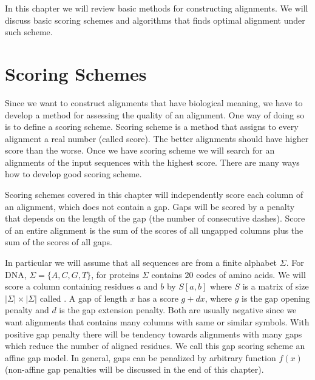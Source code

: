 In this chapter we will review basic methods for constructing alignments. We will
discuss basic scoring schemes and algorithms that finds optimal alignment under
such scheme.


\section{Scoring Schemes}

Since we want to construct alignments that have biological meaning, we have to
develop a method for assessing the quality of an alignment. One way of doing so
is to define a scoring scheme. Scoring scheme is a method that assigns to every
alignment a real number (called score). The better alignments should have higher
score than the worse. Once we have scoring scheme we will search for an
alignments of the input sequences with the highest score.  There are many ways
how to develop good scoring scheme. 


Scoring schemes covered in this chapter will independently score each column of
an alignment, which does not contain a gap. Gaps will be scored by a penalty
that depends on the length of the gap (the number of consecutive dashes). Score
of an entire alignment is the sum of the scores of all ungapped columns plus the
sum of the scores of all gaps.

In particular
we will assume that all sequences are from a finite alphabet $\Sigma$. For DNA,
$\Sigma=\{A,C,G,T\}$, for proteins $\Sigma$ contains $20$ codes of amino acids.
We will score a column containing residues $a$ and $b$ by $S[a,b]$ where $S$ is
a matrix of size $|\Sigma|\times|\Sigma|$ called .  A gap of length $x$ has a score $g+dx$, where $g$ is the gap opening
penalty and $d$ is the gap extension penalty. Both are usually negative since we
want alignments that contains many columns with same or similar symbols. With
positive gap penalty there will be tendency towards alignments with many gaps
which reduce the number of aligned residues.  We call this gap scoring scheme an
affine gap model. In general, gaps can be penalized by arbitrary function $f(x)$
(non-affine gap penalties will be discussed in the end of this chapter).

